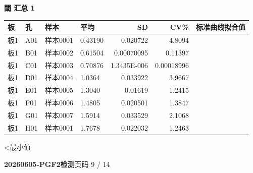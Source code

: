 \documentclass[UTF8,10pt,a4paper,fontset=fandol]{ctexart}
\begin{document}
\begin{minipage}{0.56\linewidth}
\medskip
\textbf{閾 汇总 1}

\begin{center}
\scriptsize
\begin{tabular}{llllrrr}
板 & 孔 & 样本 & 平均 & SD & CV\% & 标准曲线拟合值 \\ \hline
板1 & A01 & 样本0001 & 0.43190 & 0.020722 & 4.8094 & \\
板1 & B01 & 样本0002 & 0.61504 & 0.00070095 & 0.11397 & \\
板1 & C01 & 样本0003 & 0.70876 & 1.3435E-006 & 0.00018996 & \\
板1 & D01 & 样本0004 & 1.0364 & 0.033922 & 3.9667 & \\
板1 & E01 & 样本0005 & 1.3040 & 0.01619 & 1.2415 & \\
板1 & F01 & 样本0006 & 1.4805 & 0.020501 & 1.3847 & \\
板1 & G01 & 样本0007 & 1.5914 & 0.033529 & 2.1068 & \\
板1 & H01 & 样本0001 & 1.7678 & 0.022032 & 1.2463 & \\
\end{tabular}
\end{center}

\hfill\textless 最小值
\end{minipage}

\newpage

\begin{flushleft}
\textbf{20260605-PGF2检测}\hfill \scriptsize 页码 9 / 14
\end{flushleft}
\end{document}
